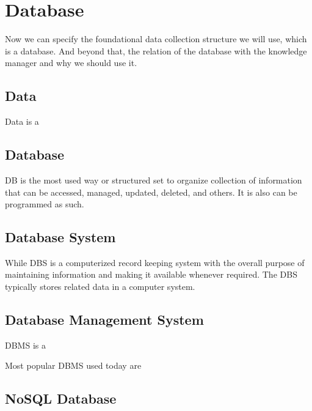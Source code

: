 \section{Database}
\label{sec:database}

Now we can specify the foundational data collection structure we will use, which is a database. And beyond that, the relation of the database with the knowledge manager and why we should use it.

\subsection{Data}

Data is a

\subsection{Database}

\ac{DB} is the most used way or structured set to organize collection of information that can be accessed, managed, updated, deleted, and others.
It is also can be programmed as such.

\subsection{Database System}

While \ac{DBS} is a computerized record keeping system with the overall purpose of maintaining information and making it available whenever required. 
The \ac{DBS} typically stores related data in a computer system.~\parencite{Foster2014Intro}

\subsection{Database Management System}

\ac{DBMS} is a
\parencite{Foster2014Intro}

Most popular \ac{DBMS} used today are

\subsection{NoSQL Database}

